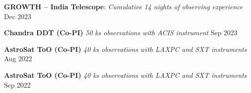 \textbf{GROWTH -- India Telescope}: \textit{Cumulative 14 nights of observing experience} \hfill Dec 2023 \\

\vspace{0.2em}

\textbf{Chandra DDT (Co-PI)} \textit{50 ks observations with ACIS instrument} \hfill Sep 2023 \\

\vspace{0.2em}

\textbf{AstroSat ToO (Co-PI)} \textit{40 ks observations with LAXPC and SXT instruments} \hfill Aug 2022 \\

\vspace{0.2em}

\textbf{AstroSat ToO (Co-PI)} \textit{40 ks observations with LAXPC and SXT instruments} \hfill Sep 2022 \\